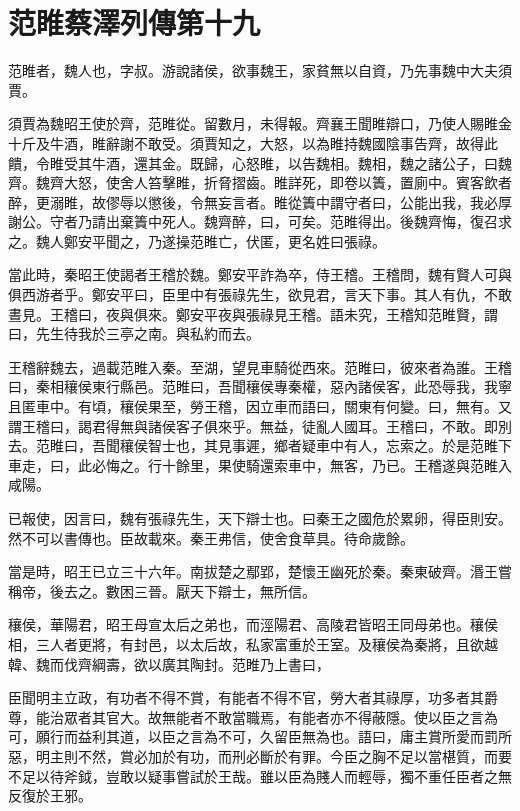 \chapter{范睢蔡澤列傳第十九}

范睢者，魏人也，字叔。游說諸侯，欲事魏王，家貧無以自資，乃先事魏中大夫須賈。

須賈為魏昭王使於齊，范睢從。留數月，未得報。齊襄王聞睢辯口，乃使人賜睢金十斤及牛酒，睢辭謝不敢受。須賈知之，大怒，以為睢持魏國陰事告齊，故得此饋，令睢受其牛酒，還其金。既歸，心怒睢，以告魏相。魏相，魏之諸公子，曰魏齊。魏齊大怒，使舍人笞擊睢，折脅摺齒。睢詳死，即卷以簀，置廁中。賓客飲者醉，更溺睢，故僇辱以懲後，令無妄言者。睢從簀中謂守者曰，公能出我，我必厚謝公。守者乃請出棄簀中死人。魏齊醉，曰，可矣。范睢得出。後魏齊悔，復召求之。魏人鄭安平聞之，乃遂操范睢亡，伏匿，更名姓曰張祿。

當此時，秦昭王使謁者王稽於魏。鄭安平詐為卒，侍王稽。王稽問，魏有賢人可與俱西游者乎。鄭安平曰，臣里中有張祿先生，欲見君，言天下事。其人有仇，不敢晝見。王稽曰，夜與俱來。鄭安平夜與張祿見王稽。語未究，王稽知范睢賢，謂曰，先生待我於三亭之南。與私約而去。

王稽辭魏去，過載范睢入秦。至湖，望見車騎從西來。范睢曰，彼來者為誰。王稽曰，秦相穰侯東行縣邑。范睢曰，吾聞穰侯專秦權，惡內諸侯客，此恐辱我，我寧且匿車中。有頃，穰侯果至，勞王稽，因立車而語曰，關東有何變。曰，無有。又謂王稽曰，謁君得無與諸侯客子俱來乎。無益，徒亂人國耳。王稽曰，不敢。即別去。范睢曰，吾聞穰侯智士也，其見事遲，鄉者疑車中有人，忘索之。於是范睢下車走，曰，此必悔之。行十餘里，果使騎還索車中，無客，乃已。王稽遂與范睢入咸陽。

已報使，因言曰，魏有張祿先生，天下辯士也。曰秦王之國危於累卵，得臣則安。然不可以書傳也。臣故載來。秦王弗信，使舍食草具。待命歲餘。

當是時，昭王已立三十六年。南拔楚之鄢郢，楚懷王幽死於秦。秦東破齊。湣王嘗稱帝，後去之。數困三晉。厭天下辯士，無所信。

穰侯，華陽君，昭王母宣太后之弟也，而涇陽君、高陵君皆昭王同母弟也。穰侯相，三人者更將，有封邑，以太后故，私家富重於王室。及穰侯為秦將，且欲越韓、魏而伐齊綱壽，欲以廣其陶封。范睢乃上書曰，

臣聞明主立政，有功者不得不賞，有能者不得不官，勞大者其祿厚，功多者其爵尊，能治眾者其官大。故無能者不敢當職焉，有能者亦不得蔽隱。使以臣之言為可，願行而益利其道，以臣之言為不可，久留臣無為也。語曰，庸主賞所愛而罰所惡，明主則不然，賞必加於有功，而刑必斷於有罪。今臣之胸不足以當椹質，而要不足以待斧鉞，豈敢以疑事嘗試於王哉。雖以臣為賤人而輕辱，獨不重任臣者之無反復於王邪。

